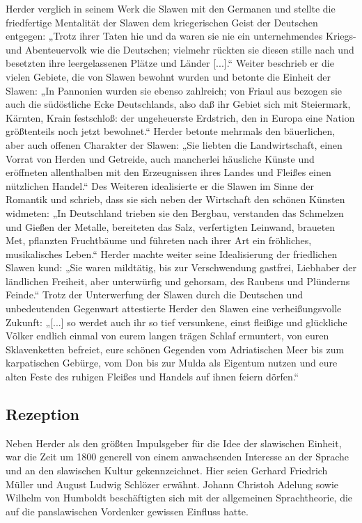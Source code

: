 \documentclass{../../sem_paper}
\begin{document}
Herder verglich in seinem Werk die Slawen mit den Germanen und stellte die friedfertige
Mentalität der Slawen dem kriegerischen Geist der Deutschen entgegen: „Trotz ihrer Taten
hie und da waren sie nie ein unternehmendes Kriegs- und Abenteuervolk wie die Deutschen;
vielmehr rückten sie diesen stille nach und besetzten ihre leergelassenen Plätze und Länder
[...].“\autocite[279]{herder} Weiter beschrieb er die vielen Gebiete, die von Slawen bewohnt
wurden und betonte die Einheit der Slawen: „In Pannonien wurden sie ebenso zahlreich; von
Friaul aus bezogen sie auch die südöstliche Ecke Deutschlands, also daß ihr Gebiet sich mit
Steiermark, Kärnten, Krain festschloß: der ungeheuerste Erdstrich, den in Europa eine Nation
größtenteils noch jetzt bewohnet.“\autocite[279]{herder} Herder betonte mehrmals den bäuerlichen, aber
auch offenen Charakter der Slawen: „Sie liebten die Landwirtschaft, einen Vorrat von Herden
und Getreide, auch mancherlei häusliche Künste und eröffneten allenthalben mit den
Erzeugnissen ihres Landes und Fleißes einen nützlichen Handel.“\autocite[280]{herder} Des Weiteren
idealisierte er die Slawen im Sinne der Romantik und schrieb, dass sie sich neben der
Wirtschaft den schönen Künsten widmeten: „In Deutschland trieben sie den Bergbau,
verstanden das Schmelzen und Gießen der Metalle, bereiteten das Salz, verfertigten
Leinwand, braueten Met, pflanzten Fruchtbäume und führeten nach ihrer Art ein fröhliches,
musikalisches Leben.“\autocite[280]{herder} Herder machte weiter seine Idealisierung der friedlichen
Slawen kund: „Sie waren mildtätig, bis zur Verschwendung gastfrei, Liebhaber der ländlichen
Freiheit, aber unterwürfig und gehorsam, des Raubens und Plünderns Feinde.“\autocite[280]{herder}
Trotz der Unterwerfung der Slawen durch die Deutschen und unbedeutenden Gegenwart
attestierte Herder den Slawen eine verheißungsvolle Zukunft: „[...] so werdet auch ihr so tief
versunkene, einst fleißige und glückliche Völker endlich einmal von eurem langen trägen
Schlaf ermuntert, von euren Sklavenketten befreiet, eure schönen Gegenden vom Adriatischen
Meer bis zum karpatischen Gebürge, vom Don bis zur Mulda als Eigentum nutzen und eure
alten Feste des ruhigen Fleißes und Handels auf ihnen feiern dörfen.“\autocite[281]{herder}

\subsection{Rezeption}
Neben Herder als den größten Impulsgeber für die Idee der slawischen Einheit, war die Zeit
um 1800 generell von einem anwachsenden Interesse an der Sprache und an den slawischen
Kultur gekennzeichnet. Hier seien Gerhard Friedrich Müller und August Ludwig Schlözer erwähnt. Johann
Christoh Adelung sowie Wilhelm von Humboldt beschäftigten sich mit der allgemeinen
Sprachtheorie, die auf die panslawischen Vordenker gewissen Einfluss hatte.\autocite{osterrieder}
\end{document}
